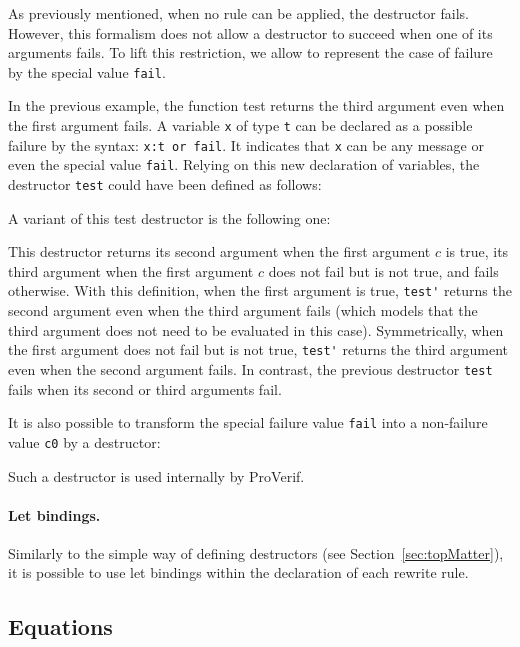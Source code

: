 \documentclass{book}
\begin{document}
As previously mentioned, when no rule can be applied, the destructor fails. However, this formalism does not allow a destructor to succeed when one of its arguments fails. To lift this restriction, we allow to represent the case of failure by the special value \lstinline!fail!.
%

%
In the previous example, the function test returns the third argument even when the first argument fails. A variable \lstinline!x! of type \lstinline!t! can be declared as a possible failure by the syntax: \lstinline!x:t or fail!. It indicates that \lstinline!x! can be any message or even the special value \lstinline!fail!. Relying on this new declaration of variables, the destructor \lstinline!test! could have been defined as follows:
%

%
A variant of this test destructor is the following one:

This destructor returns its second argument when the first argument $c$ is true,
its third argument when the first argument $c$ does not fail but is not true,
and fails otherwise. With this definition, when the first argument is true,
\lstinline!test'! returns the second
argument even when the third argument fails (which models that the third
argument does not need to be evaluated in this case). Symmetrically,
when the first argument does not fail but is not true, \lstinline!test'! returns the third
argument even when the second argument fails. In contrast, the previous
destructor \lstinline!test! fails when its second or third arguments fail.

It is also possible to transform the special failure value \lstinline!fail!
into a non-failure value \lstinline!c0! by a destructor:

Such a destructor is used internally by ProVerif.

\paragraph{Let bindings.} Similarly to the simple way of defining destructors (see Section~\ref{sec:topMatter}), it is possible to use let bindings within the declaration of each rewrite rule.

\subsection{Equations}\label{sec:equations}

\end{document}

